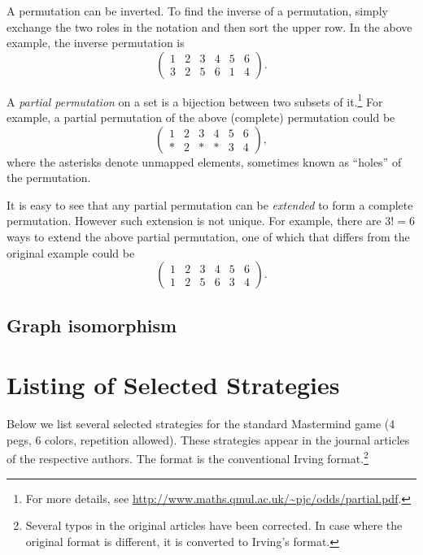 A permutation can be inverted. To find the inverse of a permutation, simply exchange the two roles in the notation and then sort the upper row. In the above example, the inverse permutation is
\[
\begin{pmatrix}
1 & 2 & 3 & 4 & 5 & 6 \\
3 & 2 & 5 & 6 & 1 & 4
\end{pmatrix} .
\]


A \emph{partial permutation} on a set is a bijection between two subsets of it.\footnote{For more details, see \url{http://www.maths.qmul.ac.uk/~pjc/odds/partial.pdf}.}
For example, a partial permutation of the above (complete) permutation could be
\[
\begin{pmatrix}
1 & 2 & 3 & 4 & 5 & 6 \\
* & 2 & * & * & 3 & 4
\end{pmatrix} ,
\]
where the asterisks denote unmapped elements, sometimes known as ``holes'' of the permutation. 

It is easy to see that any partial permutation can be \emph{extended} to form a complete permutation. However such extension is not unique. For example, there are $3! = 6$ ways to extend the above partial permutation, one of which that differs from the original example could be
\[
\begin{pmatrix}
1 & 2 & 3 & 4 & 5 & 6 \\
1 & 2 & 5 & 6 & 3 & 4
\end{pmatrix} .
\]

\section{Graph isomorphism}

\chapter{Listing of Selected Strategies}

Below we list several selected strategies for the standard Mastermind game (4 pegs, 6 colors, repetition allowed). These strategies appear in the journal articles of the respective authors. The format is the conventional Irving format.\footnote{Several typos in the original articles have been corrected. In case where the original format is different, it is converted to Irving's format.}

